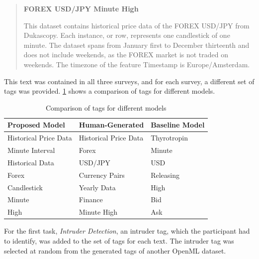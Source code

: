 \begin{quote}
    \textbf{FOREX USD/JPY Minute High}

    This dataset contains historical price data of the FOREX USD/JPY from Dukascopy. Each instance, or row, represents one candlestick of one minute. The dataset spans from January first to December thirteenth and does not include weekends, as the FOREX market is not traded on weekends. The timezone of the feature Timestamp is Europe/Amsterdam.
\end{quote}

This text was contained in all three surveys, and for each survey, a different set of tags was provided. \cref{tab:tag_comparison} shows a comparison of tags for different models.

\begin{table}[h]
    \centering
    \begin{tabular}{|>{\raggedright\arraybackslash}p{4cm}|>{\raggedright\arraybackslash}p{4cm}|>{\raggedright\arraybackslash}p{4cm}|}
        \hline
        \textbf{Proposed Model} & \textbf{Human-Generated} & \textbf{Baseline Model} \\ \hline
        Historical Price Data   & Historical Price Data    & Thyrotropin             \\ \hline
        Minute Interval         & Forex                    & Minute                  \\ \hline
        Historical Data         & USD/JPY                  & USD                     \\ \hline
        Forex                   & Currency Pairs           & Releasing               \\ \hline
        Candlestick             & Yearly Data              & High                    \\ \hline
        Minute                  & Finance                  & Bid                     \\ \hline
        High                    & Minute High              & Ask                     \\ \hline
    \end{tabular}
    \caption{Comparison of tags for different models}
    \label{tab:tag_comparison}
\end{table}

For the first task, \textit{Intruder Detection}, an intruder tag, which the participant had to identify, was added to the set of tags for each text. The intruder tag was selected at random from the generated tags of another OpenML dataset.

